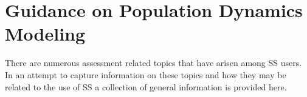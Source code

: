
\section{Guidance on Population Dynamics Modeling}

There are numerous assessment related topics that have arisen among SS users.  In an attempt to capture information on these  topics and how they may be related to the use of SS a collection of general information is provided here.





\pagebreak

